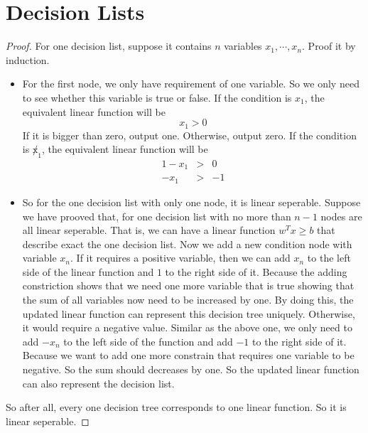 \documentclass{article}[12pt]
\begin{document}
	\section{Decision Lists}
		\begin{proof}
			For one decision list, suppose it contains $n$ variables $x_1, \cdots, x_n$. Proof it by induction.
			\begin{itemize}
			\item For the first node, we only have requirement of one variable. So we only need to see whether this variable is true or false. If the condition is $x_1$, the equivalent linear function will be 
			\begin{equation}
				x_1 > 0
			\end{equation}
			If it is bigger than zero, output one. Otherwise, output zero. 
			If the condition is $\not x_1$, the equivalent linear function will be
			\begin{eqnarray}
				1 - x_1 &>& 0 \nonumber \\
				-x_1 & > & -1 
			\end{eqnarray}
			\item So for the one decision list with only one node, it is linear seperable.
			Suppose we have prooved that, for one decision list with no more than $n - 1$ nodes are all linear seperable. That is, we can have a linear function $w^Tx \ge b$ that describe exact the one decision list. Now we add a new condition node with variable $x_n$.  \newline
			If it requires a positive variable, then we can add $x_n$ to the left side of the linear function and $1$ to the right side of it. Because the adding constriction shows that we need one more variable that is true showing that the sum of all variables now need to be increased by one. By doing this, the updated linear function can represent this decision tree uniquely. \newline
			Otherwise, it would require a negative value. Similar as the above one, we only need to add $-x_n$ to the left side of the function and add $-1$ to the right side of it. Because we want to add one more constrain that requires one variable to be negative. So the sum should decreases by one. So the updated linear function  can also represent the decision list.
			\end{itemize}
			So after all, every one decision tree corresponds to one linear function. So it is linear seperable.
		\end{proof}
\end{document}
